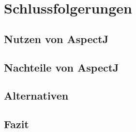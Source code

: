 \chapter{Schlussfolgerungen}
\label{chap:schlussfolgerungen}

\section{Nutzen von AspectJ}

\section{Nachteile von AspectJ}

\section{Alternativen}

\section{Fazit}